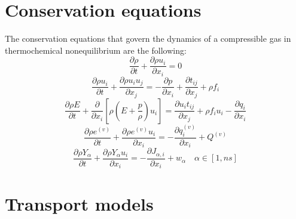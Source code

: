 \documentclass[oneside,a4paper,11pt]{report}
\begin{document}
\section{Conservation equations}
The conservation equations that govern the dynamics of a compressible gas in thermochemical nonequilibrium are the following:
\begin{equation}
\frac{\partial \rho}{\partial t} + \frac{\partial \rho u_i}{\partial x_i} = 0
\end{equation}
\begin{equation}
\frac{\partial \rho u_i}{\partial t} + \frac{\partial \rho u_i u_j}{\partial x_j} = - \frac{\partial p}{\partial x_i} + \frac{\partial t_{ij}}{\partial x_j} + \rho f_i
\end{equation}
\begin{equation}
\frac{\partial \rho E}{\partial t} + \frac{\partial}{\partial x_i} \left [ \rho \left ( E + \frac{p}{\rho} \right ) u_i \right ] = \frac{\partial u_i t_{ij}}{\partial x_j} + \rho f_i u_i -  \frac{\partial q_i}{\partial x_i}
\end{equation}
\begin{equation}
\frac{\partial \rho e^{(v)}}{\partial t} + \frac{\partial \rho e^{(v)} u_i}{\partial x_i}  = -  \frac{\partial q_i^{(v)}}{\partial x_i} + Q^{(v)}
\end{equation}
\begin{equation}
\frac{\partial\rho Y_\alpha}{\partial t}+\frac{\partial \rho Y_\alpha u_i}{\partial x_i} = -\frac{\partial J_{\alpha,i}}{\partial x_i} + w_\alpha \quad \alpha \in [1,ns]
\end{equation}

\section{Transport models}
\end{document}
